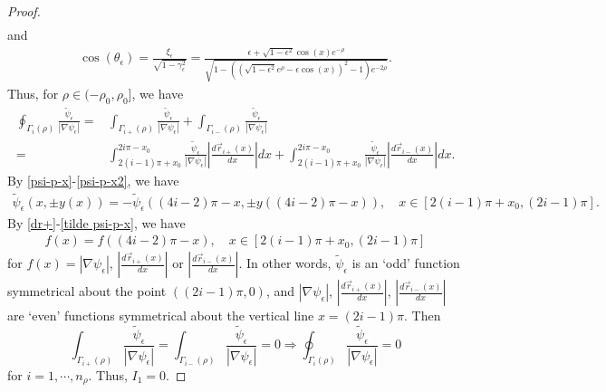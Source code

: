 \documentclass[1 [leqno, 11pt]{amsart}
\numberwithin{equation}{section}
\let\ep=\epsilon
\def\gep{\gamma_\epsilon}
\begin{document}
\begin{CJK*}{GBK}{song}
\begin{proof}
\begin{align}
\end{align}
and
\begin{align}\label{psi-p-x2}
\cos(\theta_\ep) = \frac{\xi_\ep}{\sqrt{1-\gep^2}} = \frac{\ep + \sqrt{1-\ep^2} \cos(x) e^{-\rho} }{\sqrt{1 - \left(\left( \sqrt{1-\ep^2} e^{\rho} - \ep \cos(x) \right)^2 - 1\right) e^{-2\rho}}}.
\end{align}
Thus, for $\rho\in(-\rho_0, \rho_0]$, we have
\begin{align*}
\oint_{\Gamma_i (\rho)} \frac{\tilde{\psi}_\ep}{|\nabla \psi_\ep|}
=& \int_{\Gamma_{i+} (\rho)} \frac{\tilde{\psi}_\ep}{|\nabla \psi_\ep|} + \int_{\Gamma_{i-} (\rho)} \frac{\tilde{\psi}_\ep}{|\nabla \psi_\ep|}\\
= & \int_{2(i-1)\pi + x_0}^{2i\pi - x_0} \frac{\tilde{\psi}_\ep}{|\nabla \psi_\ep|} \left|\frac{d \vec{r}_{i+}(x)}{dx}\right| dx+
 \int_{2(i-1)\pi + x_0}^{2i\pi - x_0} \frac{\tilde{\psi}_\ep}{|\nabla \psi_\ep|} \left|\frac{d \vec{r}_{i-}(x)}{dx}\right| dx.
\end{align*}
By \eqref{psi-p-x}-\eqref{psi-p-x2}, we have
\begin{align*}
\tilde{\psi}_\ep(x,\pm y(x))=-\tilde{\psi}_\ep((4i -2)\pi-x,\pm y((4i - 2)\pi-x)),\quad x \in [2(i-1)\pi + x_0, (2i - 1)\pi ].
\end{align*}
By \eqref{dr+}-\eqref{tilde psi-p-x}, we have
\begin{align*}
f(x)=f((4i - 2)\pi-x),\quad x \in [2(i-1)\pi + x_0, (2i - 1)\pi ]
\end{align*}
for $f(x)=|\nabla \psi_\ep|$, $\left|\frac{d \vec{r}_{i+}(x)}{dx}\right|$ or $\left|\frac{d \vec{r}_{i-}(x)}{dx}\right|$.
In other words, $\tilde{\psi}_\ep$ is an `odd'   function symmetrical about the point $( (2i-1)\pi,0)$, and
$|\nabla \psi_\ep|$, $\left|\frac{d \vec{r}_{i+}(x)}{dx}\right|$, $\left|\frac{d \vec{r}_{i-}(x)}{dx}\right|$ are `even'   functions symmetrical about the vertical line $x=(2i-1)\pi$.
Then
$$\int_{\Gamma_{i+} (\rho)} \frac{\tilde{\psi}_\ep}{|\nabla \psi_\ep|} = \int_{\Gamma_{i-} (\rho)} \frac{\tilde{\psi}_\ep}{|\nabla \psi_\ep|} = 0\Longrightarrow\oint_{\Gamma_i (\rho)} \frac{\tilde{\psi}_\ep}{|\nabla \psi_\ep|} = 0$$
for $i = 1, \cdots, n_\rho$.
Thus, $I_1 = 0$.


\end{proof}
\end{CJK*}
\end{document}
